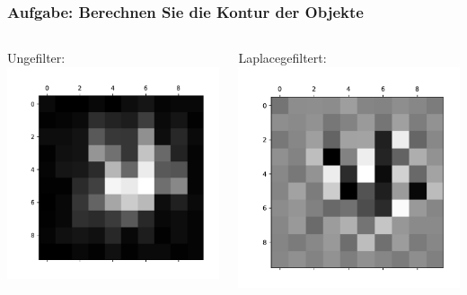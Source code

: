\documentclass[aspectratio=169]{beamer}
\begin{document}
\begin{frame}
    \frametitle{Aufgabe: Berechnen Sie die Kontur der Objekte}
\begin{columns}
    \begin{column}{0.5\textwidth}
    \begin{alertblock}
        {Ungefilter:}
        \includegraphics[width=1\textwidth]{../raw.pdf}
    \end{alertblock}
    \end{column}
    \begin{column}{0.5\textwidth}
    \begin{alertblock}
        {Laplacegefiltert:}
        \includegraphics[width=1\textwidth]{../laplace.pdf}
    \end{alertblock}
    \end{column}
    \end{columns}
\end{frame}
\end{document}
